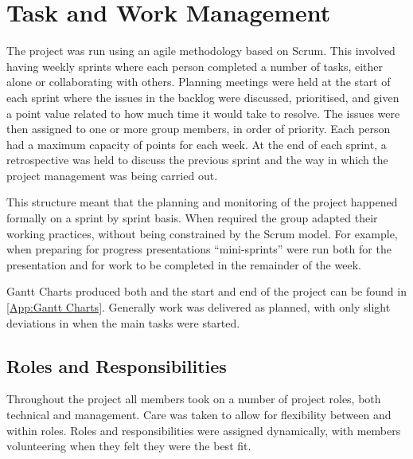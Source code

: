 \section{Task and Work Management}
\label{Section:Task and Work Management}

The project was run using an agile methodology based on Scrum. This involved having weekly sprints where each person completed a number of tasks, either alone or collaborating with others. Planning meetings were held at the start of each sprint where the issues in the backlog were discussed, prioritised, and given a point value related to how much time it would take to resolve. The issues were then assigned to one or more group members, in order of priority. Each person had a maximum capacity of points for each week. At the end of each sprint, a retrospective was held to discuss the previous sprint and the way in which the project management was being carried out.

This structure meant that the planning and monitoring of the project happened formally on a sprint by sprint basis. When required the group adapted their working practices, without being constrained by the Scrum model. For example, when preparing for progress presentations ``mini-sprints'' were run both for the presentation and for work to be completed in the remainder of the week.

Gantt Charts produced both and the start and end of the project can be found in \cref{App:Gantt Charts}. Generally work was delivered as planned, with only slight deviations in when the main tasks were started. 

\subsection{Roles and Responsibilities}

Throughout the project all members took on a number of project roles, both technical and management. Care was taken to allow for flexibility between and within roles. Roles and responsibilities were assigned dynamically, with members volunteering when they felt they were the best fit.

